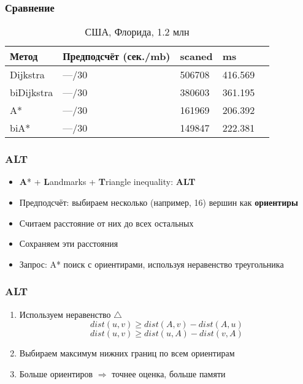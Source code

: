 \documentclass{beamer}
\begin{document}
\begin{frame}
\frametitle{Сравнение}
\begin{table}
\begin{tabular}{l l l l l}
\toprule
\textbf{Метод} & \textbf{Предподсчёт (сек./mb)} & \textbf{scaned} 
& \textbf{ms}\\
\midrule
Dijkstra    & ---/30 & 506708 & 416.569\\
biDijkstra  & ---/30 & 380603 & 361.195\\
A*          & ---/30 & 161969 & 206.392\\
biA*        & ---/30 & 149847 & 222.381\\
\bottomrule
\end{tabular}
\caption{США, Флорида, 1.2 млн}
\end{table}
\end{frame}


\begin{frame}
\frametitle{ALT}
\begin{itemize}	
  \item \textbf{A}* + \textbf{L}andmarks + 	\textbf{T}riangle inequality: \textbf{ALT} \cite{p1} 
  \item Предподсчёт: выбираем несколько (например, 16) вершин как \textbf{ориентиры}
  \item Считаем расстояние от них до всех остальных
  \item Сохраняем эти расстояния
  \item Запрос: A* поиск с ориентирами, используя неравенство треугольника
\end{itemize}
\end{frame}



\begin{frame}
\frametitle{ALT}
\begin{enumerate}	
\item Используем неравенство $\triangle$
	$$dist(u, v) \geq dist(A, v) - dist(A, u)$$
    $$dist(u, v) \geq dist(u, A) - dist(v, A)$$
\item Выбираем максимум нижних границ по всем ориентирам
\item Больше ориентиров $\Rightarrow$ точнее оценка, больше памяти
\end{enumerate}
\end{frame}

\end{document}
